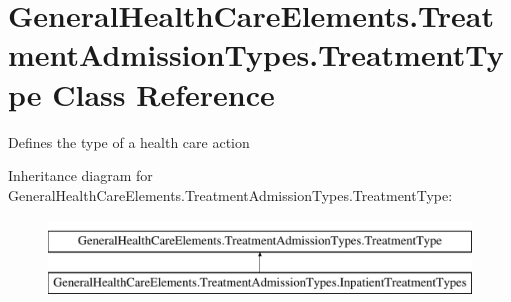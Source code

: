 \hypertarget{class_general_health_care_elements_1_1_treatment_admission_types_1_1_treatment_type}{}\section{General\+Health\+Care\+Elements.\+Treatment\+Admission\+Types.\+Treatment\+Type Class Reference}
\label{class_general_health_care_elements_1_1_treatment_admission_types_1_1_treatment_type}


Defines the type of a health care action  


Inheritance diagram for General\+Health\+Care\+Elements.\+Treatment\+Admission\+Types.\+Treatment\+Type\+:\begin{figure}[H]
\begin{center}
\leavevmode
\includegraphics[height=2.000000cm]{class_general_health_care_elements_1_1_treatment_admission_types_1_1_treatment_type}
\end{center}
\end{figure}
